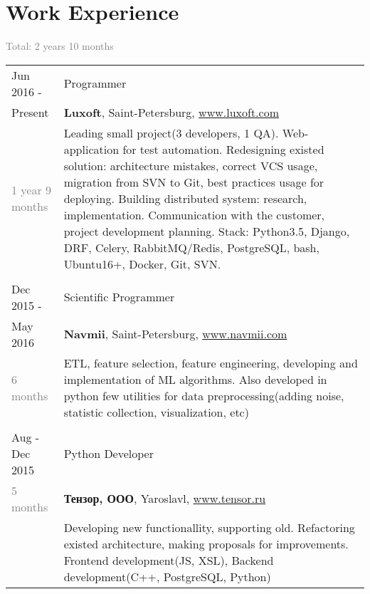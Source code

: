 \documentclass[a4paper,10pt]{article}
\begin{document}
\section{Work Experience}
\textcolor{gray}{Total: 2 years 10 months} \\
\begin{tabularx}{\textwidth}{lX}
	Jun 2016 -				&	Programmer \\
	Present					&	\textbf{Luxoft}, Saint-Petersburg,
								\href{www.luxoft.com}{www.luxoft.com} \\
	\textcolor{gray}
	{1 year 9 months}	
							&	\footnotesize{
									Leading small project(3 developers, 1 QA). \newline
									Web-application for test automation. \newline
									Redesigning existed solution: architecture mistakes, correct VCS usage, migration from SVN to Git, best practices usage for deploying. \newline
									Building distributed system: research, implementation. \newline
									Communication with the customer, project development planning. \newline\newline
									Stack: Python3.5, Django, DRF, Celery, RabbitMQ/Redis, PostgreSQL, bash, Ubuntu16+, Docker, Git, SVN.
								} \\

	\multicolumn{2}{c}{}\\

	Dec 2015 -				&	Scientific Programmer \\
	May 2016				&	\textbf{Navmii}, Saint-Petersburg,
								\href{www.navmii.com}{www.navmii.com} \\
	\textcolor{gray}
	{6 months}
							&	\footnotesize{
									ETL, feature selection, feature engineering, developing and implementation of ML algorithms.
									Also developed in python few utilities for data preprocessing(adding noise, statistic collection, visualization, etc)
								} \\

	\multicolumn{2}{c}{}\\	

	Aug - Dec 2015			&	Python Developer\\
	\textcolor{gray}
	{5 months}		
							&	\textbf{Тензор, ООО}, Yaroslavl,
								\href{www.tensor.ru}{www.tensor.ru} \\
							&	\footnotesize{
									Developing new functionallity, supporting old. Refactoring existed architecture, 
									making proposals for improvements.
									\newline\newline
									Frontend development(JS, XSL), Backend development(C++, PostgreSQL, Python)
								} \\
	

\end{tabularx}
\end{document}
